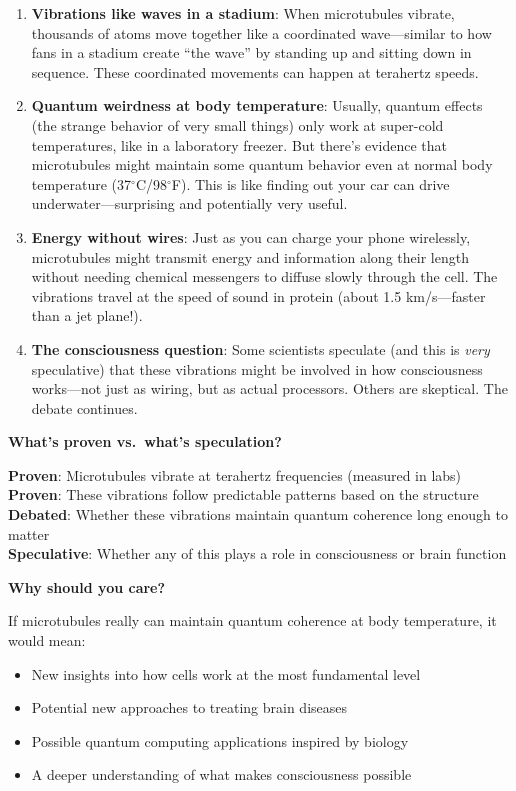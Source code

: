 \begin{enumerate}
\def\labelenumi{\arabic{enumi}.}
\item
  \textbf{Vibrations like waves in a stadium}: When microtubules
  vibrate, thousands of atoms move together like a coordinated
  wave---similar to how fans in a stadium create ``the wave'' by
  standing up and sitting down in sequence. These coordinated movements
  can happen at terahertz speeds.
\item
  \textbf{Quantum weirdness at body temperature}: Usually, quantum
  effects (the strange behavior of very small things) only work at
  super-cold temperatures, like in a laboratory freezer. But
  there's evidence that microtubules might maintain some
  quantum behavior even at normal body temperature
  (37$^\circ$C/98$^\circ$F). This
  is like finding out your car can drive underwater---surprising and
  potentially very useful.
\item
  \textbf{Energy without wires}: Just as you can charge your phone
  wirelessly, microtubules might transmit energy and information along
  their length without needing chemical messengers to diffuse slowly
  through the cell. The vibrations travel at the speed of sound in
  protein (about 1.5 km/s---faster than a jet plane!).
\item
  \textbf{The consciousness question}: Some scientists speculate (and
  this is \emph{very} speculative) that these vibrations might be
  involved in how consciousness works---not just as wiring, but as
  actual processors. Others are skeptical. The debate continues.
\end{enumerate}

\textbf{What's proven vs.~what's
speculation?}

\textbf{Proven}: Microtubules vibrate at terahertz frequencies (measured
in labs)\\
\textbf{Proven}: These vibrations follow predictable patterns based on
the structure\\
\textbf{Debated}: Whether these vibrations maintain quantum coherence
long enough to matter\\
\textbf{Speculative}: Whether any of this plays a role in consciousness
or brain function

\textbf{Why should you care?}

If microtubules really can maintain quantum coherence at body
temperature, it would mean:
\begin{itemize}
\item New insights into how cells work at the most fundamental level
\item Potential new approaches to treating brain diseases
\item Possible quantum computing applications inspired by biology
\item A deeper understanding of what makes consciousness possible
\end{itemize}

